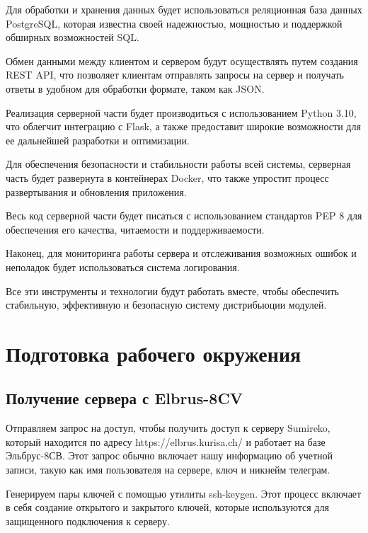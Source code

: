 Для обработки и хранения данных будет использоваться реляционная база данных PostgreSQL, которая известна своей надежностью, мощностью и поддержкой обширных возможностей SQL. 

Обмен данными между клиентом и сервером будут осуществлять путем создания REST API, что позволяет клиентам отправлять запросы на сервер и получать ответы в удобном для обработки формате, таком как JSON.

Реализация серверной части будет производиться с использованием Python 3.10, что облегчит интеграцию с Flask, а также предоставит широкие возможности для ее дальнейшей разработки и оптимизации.

Для обеспечения безопасности и стабильности работы всей системы, серверная часть будет развернута в контейнерах Docker, что также упростит процесс развертывания и обновления приложения.

Весь код серверной части будет писаться с использованием стандартов PEP 8 \cite{dev:pep} для обеспечения его качества, читаемости и поддерживаемости. 


Наконец, для мониторинга работы сервера и отслеживания возможных ошибок и неполадок будет использоваться система логирования. 

Все эти инструменты и технологии будут работать вместе, чтобы обеспечить стабильную, эффективную и безопасную систему дистрибьюции модулей.

\section{Подготовка рабочего окружения}

\subsection{Получение сервера с Elbrus-8CV}

Отправляем запрос на доступ, чтобы получить доступ к серверу Sumireko, который находится по адресу https://elbrus.kurisa.ch/ и работает на базе Эльбрус-8СВ. Этот запрос обычно включает нашу информацию об учетной записи, такую как имя пользователя на сервере, ключ и никнейм телеграм.

Генерируем пары ключей с помощью утилиты ssh-keygen. Этот процесс включает в себя создание открытого и закрытого ключей, которые используются для защищенного подключения к серверу. 

